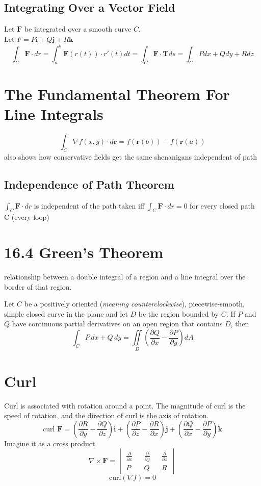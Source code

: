 \documentclass{report}
\newcommand{\pdif}[2]{ \frac{\partial #1}{ \partial #2} }
\newcommand{\pderiv}[1]{ \frac{\partial}{ \partial #1} }
\begin{document}
\subsection{Integrating Over a Vector Field}
Let $\mathbf{F}$ be integrated over a smooth curve $C$. \\
Let $F = P\mathbf{i} + Q\mathbf{j} + R\mathbf{k}$
$$
\int_C \mathbf{F} \cdot dr = 
\int_a^b \mathbf{F}(r(t)) \cdot r'(t) dt =
\int_C \mathbf{F} \cdot \mathbf{T} ds =
\int_C P dx + Q dy + R dz
$$

\newpage
\section{The Fundamental Theorem For Line Integrals}
$$
\int_C \nabla f(x, y) \cdot d\mathbf{r} = f(\mathbf{r}(b)) - f(\mathbf{r}(a))
$$
also shows how conservative fields get the same shenanigans independent of path
\subsection{Independence of Path Theorem}
$\int_C \mathbf{F} \cdot dr$ is independent of the path taken iff $\int_C \mathbf{F} \cdot dr = 0$ for every closed path C (every loop)


\section{16.4 Green's Theorem}
relationship between a double integral of a region and a line integral over the border of that region.

Let $C$ be a positively oriented (\textit{meaning counterclockwise}), piecewise-smooth, simple
closed curve in the plane and let $D$ be the region bounded by $C$. If $P$ and $Q$ have
continuous partial derivatives on an open region that contains $D$, then
$$
\int_C P \,dx + Q \,dy = \iint \limits_D (\pdif{Q}{x} - \pdif{P}{y}) dA
$$

\section{Curl}
Curl is associated with rotation around a point. The magnitude of curl is the speed of rotation, and the direction of curl is the axis of rotation.
$$
\text{curl } \mathbf{F} = 
\left( \pdif{R}{y} - \pdif{Q}{z} \right) \mathbf{i} +
\left( \pdif{P}{z} - \pdif{R}{x} \right) \mathbf{j}+
\left( \pdif{Q}{x} - \pdif{P}{y} \right) \mathbf{k}
$$
Imagine it as a cross product
$$
\nabla \times \mathbf{F} = 
\begin{vmatrix}
\pderiv{x} &&
\pderiv{y} &&
\pderiv{z} \\
P &&
Q &&
R
\end{vmatrix}
$$
$$
\text{curl}(\nabla f) = 0
$$
\end{document}
